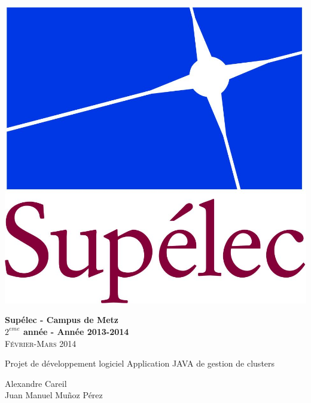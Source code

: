 \begin{minipage}{1\textwidth}
  \centering 

  \begin{flushleft}
    \includegraphics[scale=0.3]{LogoSup.jpg}
    \newline

    \textbf{Supélec - Campus de Metz\\
      $2^{eme}$ année - Année 2013-2014}\\
    \textsc{Février-Mars 2014}
  \end{flushleft}
  
  \vskip 5cm
  {\LARGE\textsc Projet de développement logiciel}
  \vskip 0.5cm
  {\LARGE\textsc Application JAVA de gestion de clusters}
  \vskip 5cm

  \Large{Alexandre Careil \\
    Juan Manuel Mu\~noz Pérez}
\end{minipage}

